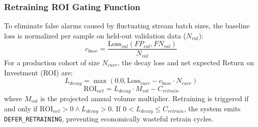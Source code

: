 \documentclass[conference]{IEEEtran}
\begin{document}
\subsubsection{Retraining ROI Gating Function}
To eliminate false alarms caused by fluctuating stream batch sizes, the baseline loss is normalized per sample on held-out validation data ($N_{val}$):
\begin{equation}
c_{base} = \frac{\text{Loss}_{val}(FP_{val}, FN_{val})}{N_{val}}
\end{equation}
For a production cohort of size $N_{curr}$, the decay loss and net expected Return on Investment (ROI) are:
\begin{equation}
L_{decay} = \max\left( 0.0, \text{Loss}_{curr} - c_{base} \cdot N_{curr} \right)
\end{equation}
\begin{equation}
\text{ROI}_{net} = L_{decay} \cdot M_{vol} - C_{retrain}
\end{equation}
where $M_{vol}$ is the projected annual volume multiplier. Retraining is triggered if and only if $\text{ROI}_{net} > 0 \land L_{decay} > 0$. If $0 < L_{decay} \le C_{retrain}$, the system emits \texttt{DEFER\_RETRAINING}, preventing economically wasteful retrain cycles.
\end{document}
